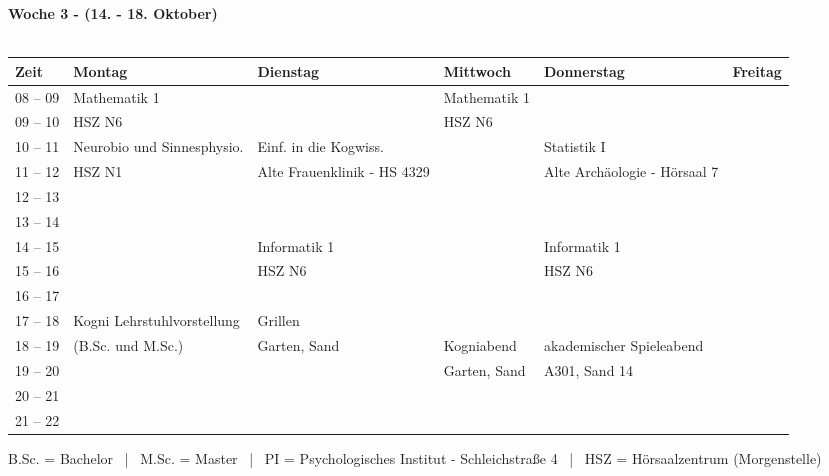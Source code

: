 \textbf{Woche 3 - (14. - 18. Oktober)}\\
\\
\begin{tabular}{|l|p{}|p{}|p{}|p{}|p{}|} \hline
	Zeit & Montag & Dienstag & Mittwoch & Donnerstag & Freitag \\ 
	\hline \hline
 08 -- 09 & \footnotesize{Mathematik 1} & & \footnotesize{Mathematik 1} & & \\ \cline{1-1}
 09 -- 10 & \scriptsize{HSZ N6} & & \scriptsize{HSZ N6} & & \\ \hline
 10 -- 11 & \footnotesize{Neurobio und Sinnesphysio.} & \footnotesize{Einf. in die Kogwiss.} & & \footnotesize{Statistik I} & \\ \cline{1-1} 
 11 -- 12 & \scriptsize{HSZ N1} & \scriptsize{Alte Frauenklinik - HS 4329} & & \scriptsize{Alte Archäologie - Hörsaal 7} & \\ \hline
 12 -- 13 & & & & & \\ \cline{1-1}
 13 -- 14 & & & & & \\ \hline
 14 -- 15 & & \footnotesize{Informatik 1} & & \footnotesize{Informatik 1} & \\  \cline {1-1}
 15 -- 16 & & \scriptsize{HSZ N6} & & \scriptsize{HSZ N6} & \\ \hline
 16 -- 17 & & & & & \\ \cline{1-2}
 17 -- 18 & \scriptsize{Kogni Lehr\-stuhl\-vor\-stell\-ung} &\footnotesize{Grillen}  \cellcolor{lightlightgray}& & & \\ \cline{1-1} \cline{4-6}
 18 -- 19 & \scriptsize{(B.Sc. und M.Sc.)} &\scriptsize{Garten, Sand} \cellcolor{lightlightgray} & \footnotesize{Kogniabend} \cellcolor{lightlightgray}& \footnotesize{akademischer Spieleabend}  \cellcolor{lightlightgray}& \\ \cline{1-2}
 19 -- 20 & & \cellcolor{lightlightgray} &\scriptsize{Garten, Sand} \cellcolor{lightlightgray}& \cellcolor{lightlightgray} \scriptsize{A301, Sand 14} & \\ \cline{1-1} \cline{6-6}
 20 -- 21 & &  \cellcolor{lightlightgray}&  \cellcolor{lightlightgray}&  \cellcolor{lightlightgray}& \\ \cline{1-1}
 21 -- 22 & & \cellcolor{lightlightgray} &  \cellcolor{lightlightgray}&  \cellcolor{lightlightgray}& \\ \hline
\end{tabular}

\scriptsize{B.Sc. = Bachelor ~|~ M.Sc. = Master ~|~ PI = Psychologisches Institut - Schleichstraße 4 ~|~ HSZ = Hörsaalzentrum (Morgenstelle)}

